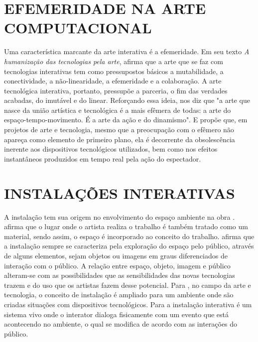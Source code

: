 \section{EFEMERIDADE NA ARTE COMPUTACIONAL}

Uma característica marcante da arte interativa é a efemeridade. Em seu texto \textit{A humanização das tecnologias pela arte},  afirma que a arte que se faz com tecnologias interativas tem como pressupostos básicos a mutabilidade, a conectividade, a não-linearidade, a efemeridade e a colaboração. A arte tecnológica interativa, portanto, pressupõe a parceria, o fim das verdades acabadas, do imutável e do linear. Reforçando essa ideia,  nos diz que "a arte que nasce da união artística e tecnológica é a mais efêmera de todas: a arte do espaço-tempo-movimento. É a arte da ação e do dinamismo". E  propõe que, em projetos de arte e tecnologia, mesmo que a preocupação com o efêmero não apareça como elemento de primeiro plano, ela é decorrente da obsolescência inerente aos dispositivos tecnológicos utilizados, bem como nos efeitos instantâneos produzidos em tempo real pela ação do espectador.

\section{INSTALAÇÕES INTERATIVAS}

A instalação tem sua origem no envolvimento do espaço ambiente na obra .  afirma que o lugar onde o artista realiza o trabalho é também tratado como um material, sendo assim, o espaço é incorporado ao conceito do trabalho.  afirma que a instalação sempre se
caracteriza pela exploração do espaço pelo público, através de alguns elementos, sejam objetos ou imagens em graus diferenciados de interação com o público. A relação entre espaço, objeto, imagem e público alteram-se com as possibilidades que as sensibilidades das novas tecnologias trazem e do uso que os artistas fazem desse potencial. Para , no campo da arte e tecnologia, o conceito de instalação é ampliado para um ambiente onde são criadas situações com dispositivos tecnológicos. Para  a instalação interativa é um sistema vivo onde o interator dialoga fisicamente com um evento que está acontecendo no ambiente, o qual se modifica de acordo com as interações do público.


